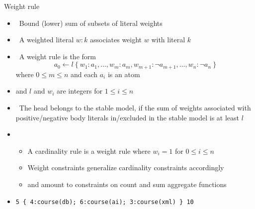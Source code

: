 \begin{frame}[fragile]{Weight rule}
  \label{eqn:weight:rule}
  \begin{itemize}
  \item<only@1-2>  \ Bound (lower) sum of subsets of literal weights
  \item {} \ A \alert{weighted literal} $w:k$ associates weight $w$ with literal $k$
  \item {} \ A \alert{weight rule} is the form
    \[
      a_0\leftarrow l~\{\ w_1:a_1,\dots,w_m:a_m,w_{m+1}:\neg a_{m+1},\dots,w_n:\neg a_n\ \}
    \]
    where $0\leq m\leq n$ and each $a_i$ is an atom
  \item [] and $l$ and $w_i$ are integers for $1\leq i\leq n$
    \smallskip
  \item<only@2>  \
    The head belongs to the stable model,
    if the sum of weights associated with positive/negative body literals in/excluded in the stable model
    is at least $l$

  \item<only@3-> 
    \begin{itemize}\normalsize
    \item A cardinality rule is a weight rule where $w_i=1$  for $0\leq i\leq n$
    \item<only@4-> Weight constraints generalize cardinality constraints accordingly
    \item<only@4->[] and amount to constraints on count and sum aggregate functions
    \end{itemize}

  \item<only@5-> 
\begin{lstlisting}[basicstyle=\ttfamily\small]
5 { 4:course(db); 6:course(ai); 3:course(xml) } 10
\end{lstlisting}
  \end{itemize}
\end{frame}
%

